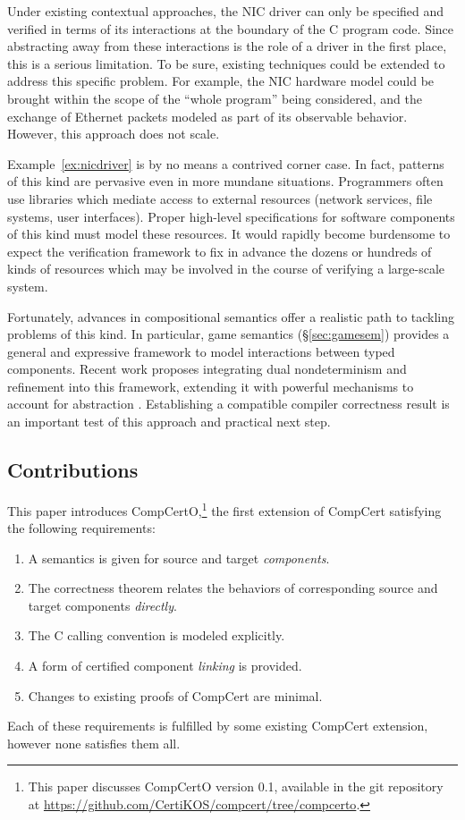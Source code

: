 \documentclass[sigplan,screen]{acmart}
\begin{document}
Under existing contextual approaches,
the NIC driver can only be specified and verified in terms of
its interactions at the boundary of the C program code.
Since abstracting away from these interactions
is the role of a driver in the first place,
this is a serious limitation.
%
To be sure,
existing techniques could be extended
to address this specific problem.
For example,
the NIC hardware model could be brought
within the scope of the ``whole program'' being considered,
and the exchange of Ethernet packets
modeled as part of its observable behavior.
However, this approach does not scale.

Example~\ref{ex:nicdriver}
is by no means a contrived corner case.
In fact, patterns of this kind are pervasive even in more mundane situations.
Programmers often use libraries
which mediate access to external resources
(network services, file systems, user interfaces).
Proper high-level specifications
for software components of this kind
must model these resources.
It would rapidly become burdensome to expect
the verification framework
to fix in advance
the dozens or hundreds
of kinds of resources
which may be involved
in the course of verifying a large-scale system.

Fortunately,
advances in compositional semantics
offer a realistic path
to tackling problems of this kind.
In particular,
game semantics (\S\ref{sec:gamesem})
provides a general and expressive framework
to model interactions between typed components.
Recent work proposes integrating
dual nondeterminism and refinement
into this framework,
extending it with powerful mechanisms
to account for abstraction \cite{rbgs-cal}.
Establishing a compatible compiler correctness result
is an important test of this approach
and practical next step.


\subsection{Contributions} \label{sec:compcertreq} %

This paper introduces CompCertO,\footnote{%
  This paper discusses CompCertO version 0.1,
  available in the git repository at
  \url{https://github.com/CertiKOS/compcert/tree/compcerto}.
  }
the first extension of CompCert
satisfying the following requirements:
\begin{enumerate}
\item \label{req:opensem}
  A semantics is given for
  source and target \emph{components}.
\item \label{req:opensim}
  The correctness theorem relates
  the behaviors of corresponding
  source and target components \emph{directly}.
\item \label{req:openabs}
  The C calling convention is modeled explicitly.
\item \label{req:linking}
  A form of certified component \emph{linking}
  is provided.
\item \label{req:complexity}
  Changes to existing proofs of CompCert
  are minimal.
\end{enumerate}
Each of these requirements is fulfilled
by some existing CompCert extension,
however none satisfies them all.
\end{document}
